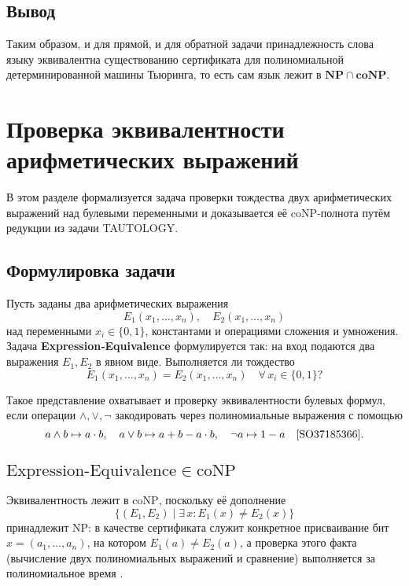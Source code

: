 \documentclass[a4paper,12pt]{article}
\begin{document}
\subsection{Вывод}
Таким образом, и для прямой, и для обратной задачи принадлежность слова языку эквивалентна существованию сертификата для полиномиальной детерминированной машины Тьюринга, то есть сам язык лежит в \(\mathbf{NP \cap coNP}\).
\newpage
\section{Проверка эквивалентности арифметических выражений}

В этом разделе формализуется задача проверки тождества двух арифметических выражений над булевыми переменными и доказывается её \(\mathrm{coNP}\)‑полнота путём редукции из задачи TAUTOLOGY.

\subsection{Формулировка задачи}

Пусть заданы два арифметических выражения
\[
E_1(x_1,\dots,x_n),\quad E_2(x_1,\dots,x_n)
\]
над переменными \(x_i\in\{0,1\}\), константами и операциями сложения и умножения.
Задача \textbf{Expression‑Equivalence} формулируется так: на вход подаются два выражения \(E_1,E_2\) в явном виде. Выполняется ли тождество
\[
E_1(x_1,\dots,x_n)=E_2(x_1,\dots,x_n)
\quad\forall\,x_i\in\{0,1\}?
\]
\medskip

Такое представление охватывает и проверку эквивалентности булевых формул, если операции \(\land,\lor,\lnot\) закодировать через полиномиальные выражения с помощью
\[
a\land b\mapsto a\cdot b,\quad
a\lor b\mapsto a + b - a\cdot b,\quad
\lnot a\mapsto 1 - a\quad
\text{\cite{SO37185366}.}\]

\subsection{\(\mathrm{Expression\text{-}Equivalence}\in\mathrm{coNP}\)}

Эквивалентность лежит в \(\mathrm{coNP}\), поскольку её дополнение
\[
\{(E_1,E_2)\mid \exists\,x\!:E_1(x)\neq E_2(x)\}
\]
принадлежит NP: в качестве сертификата служит конкретное присваивание бит \(x=(a_1,\dots,a_n)\), на котором
\(
E_1(a)\neq E_2(a)
\),
а проверка этого факта (вычисление двух полиномиальных выражений и сравнение) выполняется за полиномиальное время \cite{CSE76579}.
\end{document}

